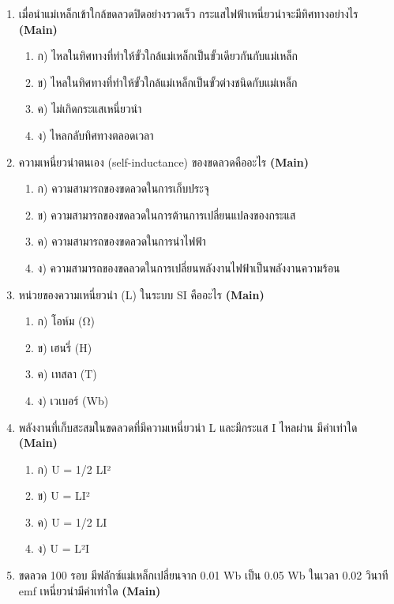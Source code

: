 \documentclass[12pt]{article}
\begin{document}
\begin{enumerate}[label=\arabic*.]
\begin{enumerate}[label=)]
\item ข) หมุนขดลวดในสนามแม่เหล็ก
\item ค) วางขดลวดนิ่งในสนามแม่เหล็กคงที่
\item ง) เปลี่ยนพื้นที่ของขดลวดในสนามแม่เหล็กคงที่
\end{enumerate}
\item เมื่อนำแม่เหล็กเข้าใกล้ขดลวดปิดอย่างรวดเร็ว กระแสไฟฟ้าเหนี่ยวนำจะมีทิศทางอย่างไร \hfill \textbf{\small (Main)}
\begin{enumerate}[label=)]
\item ก) ไหลในทิศทางที่ทำให้ขั้วใกล้แม่เหล็กเป็นขั้วเดียวกันกับแม่เหล็ก
\item ข) ไหลในทิศทางที่ทำให้ขั้วใกล้แม่เหล็กเป็นขั้วต่างชนิดกับแม่เหล็ก
\item ค) ไม่เกิดกระแสเหนี่ยวนำ
\item ง) ไหลกลับทิศทางตลอดเวลา
\end{enumerate}
\item ความเหนี่ยวนำตนเอง (self-inductance) ของขดลวดคืออะไร \hfill \textbf{\small (Main)}
\begin{enumerate}[label=)]
\item ก) ความสามารถของขดลวดในการเก็บประจุ
\item ข) ความสามารถของขดลวดในการต้านการเปลี่ยนแปลงของกระแส
\item ค) ความสามารถของขดลวดในการนำไฟฟ้า
\item ง) ความสามารถของขดลวดในการเปลี่ยนพลังงานไฟฟ้าเป็นพลังงานความร้อน
\end{enumerate}
\item หน่วยของความเหนี่ยวนำ (L) ในระบบ SI คืออะไร \hfill \textbf{\small (Main)}
\begin{enumerate}[label=)]
\item ก) โอห์ม (Ω)
\item ข) เฮนรี่ (H)
\item ค) เทสลา (T)
\item ง) เวเบอร์ (Wb)
\end{enumerate}
\item พลังงานที่เก็บสะสมในขดลวดที่มีความเหนี่ยวนำ L และมีกระแส I ไหลผ่าน มีค่าเท่าใด \hfill \textbf{\small (Main)}
\begin{enumerate}[label=)]
\item ก) U = 1/2 LI²
\item ข) U = LI²
\item ค) U = 1/2 LI
\item ง) U = L²I
\end{enumerate}
\item ขดลวด 100 รอบ มีฟลักซ์แม่เหล็กเปลี่ยนจาก 0.01 Wb เป็น 0.05 Wb ในเวลา 0.02 วินาที emf เหนี่ยวนำมีค่าเท่าใด \hfill \textbf{\small (Main)}

\end{enumerate}
\end{document}

